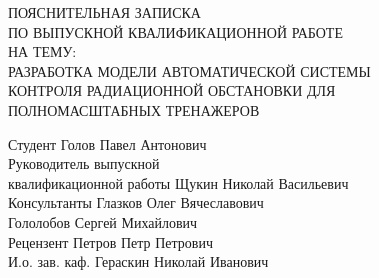\begin{center}
	\large
	\hfill \break \hfill \break \hfill \break \hfill \break
	ПОЯСНИТЕЛЬНАЯ ЗАПИСКА\\ ПО ВЫПУСКНОЙ КВАЛИФИКАЦИОННОЙ РАБОТЕ\\ НА ТЕМУ:\\[1.5cm]

	\normalsize
	РАЗРАБОТКА МОДЕЛИ АВТОМАТИЧЕСКОЙ СИСТЕМЫ \\ КОНТРОЛЯ РАДИАЦИОННОЙ ОБСТАНОВКИ ДЛЯ \\ПОЛНОМАСШТАБНЫХ ТРЕНАЖЕРОВ\\[1.5cm]
\end{center}

Студент \hspace{2.1cm} \underline{\hspace{4.2cm}} Голов Павел Антонович\\[0.6cm]

Руководитель выпускной\\ квалификационной работы\hspace{4.5cm} \underline{\hspace{4.2cm}} Щукин Николай Васильевич\\[0.6cm]

Консультанты \hspace{2.1cm} \underline{\hspace{4.2cm}} Глазков Олег Вячеславович\\
			 \hspace{2.1cm} \underline{\hspace{4.2cm}} Гололобов Сергей Михайлович\\[0.6cm]

Рецензент \hspace{2.1cm} \underline{\hspace{4.2cm}} Петров Петр Петрович\\[0.6cm]

И.о. зав. каф. \hspace{2.1cm} \underline{\hspace{4.2cm}} Гераскин Николай Иванович

\clearpage